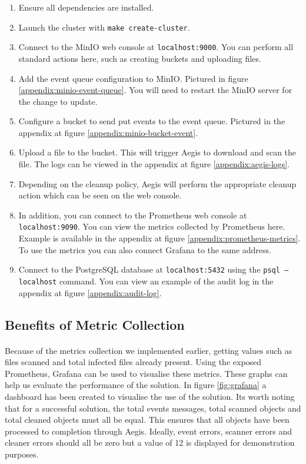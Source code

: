 \documentclass[12pt, conference, final, a4paper, onecolumn, compsoc]{IEEEtran}
\begin{document}
\begin{enumerate}
  \item Ensure all dependencies are installed.
  \item Launch the cluster with \texttt{make create-cluster}.
  \item Connect to the MinIO web console at \texttt{localhost:9000}. You can
        perform all standard actions here, such as creating buckets and
        uploading files.
  \item Add the event queue configuration to MinIO. Pictured in figure
        \ref{appendix:minio-event-queue}. You will need to restart the MinIO
        server for the change to update.
  \item Configure a bucket to send put events to the event queue. Pictured in
        the appendix at figure \ref{appendix:minio-bucket-event}.
  \item Upload a file to the bucket. This will trigger Aegis to download and
        scan the file. The logs can be viewed in the appendix at figure
        \ref{appendix:aegis-logs}.
  \item Depending on the cleanup policy, Aegis will perform the appropriate
        cleanup action which can be seen on the web console.
  \item In addition, you can connect to the Prometheus web console at
        \texttt{localhost:9090}. You can view the metrics collected by
        Prometheus here. Example is available in the appendix at figure
        \ref{appendix:prometheus-metrics}. To use the metrics you can also
        connect Grafana to the same address.
  \item Connect to the PostgreSQL database at \texttt{localhost:5432} using the
        \texttt{psql --localhost} command. You can view an example of the audit
        log in the appendix at figure \ref{appendix:audit-log}.
\end{enumerate}

\subsection{Benefits of Metric Collection}
\paragraph{}
Because of the metrics collection we implemented earlier, getting values such as
files scanned and total infected files already present. Using the exposed
Prometheus, Grafana can be used to visualise these metrics. These graphs can
help us evaluate the performance of the solution. In figure \ref{fig:grafana} a
dashboard has been created to visualise the use of the solution. Its worth
noting that for a successful solution, the total events messages, total scanned
objects and total cleaned objects must all be equal. This ensures that all
objects have been processed to completion through Aegis. Ideally, event errors,
scanner errors and cleaner errors should all be zero but a value of 12 is
displayed for demonstration purposes.
\end{document}
